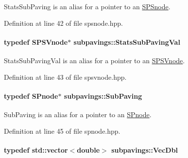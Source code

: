 \-Stats\-Sub\-Paving is an alias for a pointer to an \hyperlink{classsubpavings_1_1SPSnode}{\-S\-P\-Snode}. 



\-Definition at line 42 of file spsnode.\-hpp.

\hypertarget{namespacesubpavings_a2ef81a0baf365fed575183b748d8b8ff}{
\paragraph[{\-Stats\-Sub\-Paving\-Val}]{\setlength{\rightskip}{0pt plus 5cm}typedef {\bf \-S\-P\-S\-Vnode}$\ast$ {\bf subpavings\-::\-Stats\-Sub\-Paving\-Val}}}\label{namespacesubpavings_a2ef81a0baf365fed575183b748d8b8ff}


\-Stats\-Sub\-Paving\-Val is an alias for a pointer to an \hyperlink{classsubpavings_1_1SPSVnode}{\-S\-P\-S\-Vnode}. 



\-Definition at line 43 of file spsvnode.\-hpp.

\hypertarget{namespacesubpavings_a7e50e3fe54ef41646fbb6155160805cc}{
\paragraph[{\-Sub\-Paving}]{\setlength{\rightskip}{0pt plus 5cm}typedef {\bf \-S\-Pnode}$\ast$ {\bf subpavings\-::\-Sub\-Paving}}}\label{namespacesubpavings_a7e50e3fe54ef41646fbb6155160805cc}


\-Sub\-Paving is an alias for a pointer to an \hyperlink{classsubpavings_1_1SPnode}{\-S\-Pnode}. 



\-Definition at line 45 of file spnode.\-hpp.

\hypertarget{namespacesubpavings_a6b4d2e61b2f0b65cacc9c9322d89bc37}{
\paragraph[{\-Vec\-Dbl}]{\setlength{\rightskip}{0pt plus 5cm}typedef std\-::vector$<$double$>$ {\bf subpavings\-::\-Vec\-Dbl}}}\label{namespacesubpavings_a6b4d2e61b2f0b65cacc9c9322d89bc37}


